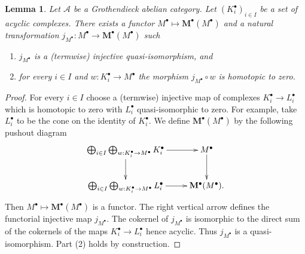 \documentclass[10pt,a4paper]{amsart}
\theoremstyle{plain}
\newtheorem{lemma}[subsection]{Lemma}
\theoremstyle{definition}
\theoremstyle{remark}
\numberwithin{equation}{subsection}
\begin{document}
\begin{lemma}
\label{lemma-functorial-homotopies}
Let $\mathcal{A}$ be a Grothendieck abelian category.
Let $(K_i^\bullet)_{i \in I}$ be a set of acyclic complexes.
There exists a functor $M^\bullet \mapsto \mathbf{M}^\bullet(M^\bullet)$
and a natural transformation
$j_{M^\bullet} : M^\bullet \to \mathbf{M}^\bullet(M^\bullet)$
such
\begin{enumerate}
\item $j_{M^\bullet}$ is a (termwise) injective quasi-isomorphism, and
\item for every $i \in I$ and $w : K_i^\bullet \to M^\bullet$
the morphism $j_{M^\bullet} \circ w$ is homotopic to zero.
\end{enumerate}
\end{lemma}

\begin{proof}
For every $i \in I$ choose a (termwise) injective map of complexes
$K_i^\bullet \to L_i^\bullet$ which is homotopic to zero with
$L_i^\bullet$ quasi-isomorphic to zero. For example, take $L_i^\bullet$
to be the cone on the identity of $K_i^\bullet$.
We define $\mathbf{M}^\bullet(M^\bullet)$ by the following pushout diagram
$$
\xymatrix{
\bigoplus_{i \in I}
\bigoplus_{w : K_i^\bullet \to M^\bullet}
K_i^\bullet \ar[r] \ar[d] & M^\bullet \ar[d] \\
\bigoplus_{i \in I}
\bigoplus_{w : K_i^\bullet \to M^\bullet}
L_i^\bullet \ar[r] &  \mathbf{M}^\bullet(M^\bullet).
}
$$
Then $M^\bullet \mapsto \mathbf{M}^\bullet(M^\bullet)$ is a functor. The right
vertical arrow defines the functorial injective map $j_{M^\bullet}$.
The cokernel of $j_{M^\bullet}$ is isomorphic to the direct sum of
the cokernels of the maps $K_i^\bullet \to L_i^\bullet$ hence acyclic.
Thus $j_{M^\bullet}$ is a quasi-isomorphism. Part (2) holds by construction.
\end{proof}
\end{document}
